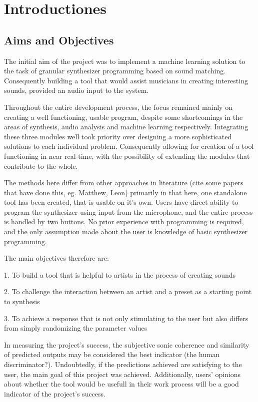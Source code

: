\chapter{Introductiones}
\section{Aims and Objectives}

The initial aim of the project was to implement a machine learning
solution to the task of granular synthesizer programming based on
sound matching.  Consequently building a tool that would assist
musicians in creating interesting sounds, provided an audio input to
the system.

Throughout the entire development process, the focus remained mainly
on creating a well functioning, usable program, despite some
shortcomings in the areas of synthesis, audio analysis and machine
learning respectively. Integrating these three modules well took
priority over designing a more sophisticated solutions to each
individual problem. Consequently allowing for creation of a tool
functioning in near real-time, with the possibility of extending the
modules that contribute to the whole.

The methods here differ from other approaches in literature (cite some
papers that have done this, eg. Matthew, Leon) primarily in that here,
one standalone tool has been created, that is usable on it's
own. Users have direct ability to program the synthesizer using input
from the microphone, and the entire process is handled by two
buttons. No prior experience with programming is required, and the
only assumption made about the user is knowledge of basic synthesizer
programming.

The main objectives therefore are:

1. To build a tool that is helpful to artists in the process of
creating sounds 

2. To challenge the interaction between an artist and a preset as a
starting point to synthesis 

3. To achieve a response that is not only stimulating to the user but
also differs from simply randomizing the parameter values

In measuring the project's success, the subjective sonic coherence and
similarity of predicted outputs may be considered the best indicator (the
human discriminator?). Undoubtedly, if the predictions achieved are
satisfying to the user, the main goal of this project was
achieved. Additionally, users' opinions about whether the tool would
be usefull in their work process will be a good indicator of the
project's success.

